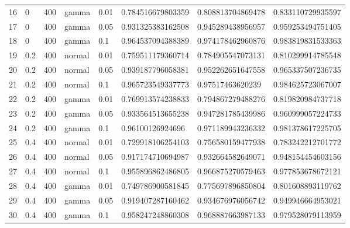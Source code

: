 \begin{table}[ht]
\begin{tabular}{rlllllll}
  16 & 0 & 400 & gamma & 0.01 & 0.784516679803359 & 0.808813704869478 & 0.833110729935597 \\ 
  17 & 0 & 400 & gamma & 0.05 & 0.931325383162508 & 0.945289438956957 & 0.959253494751405 \\ 
  18 & 0 & 400 & gamma & 0.1 & 0.964537094388389 & 0.974178462960876 & 0.983819831533363 \\ 
  19 & 0.2 & 400 & normal & 0.01 & 0.759511179360714 & 0.784905547073131 & 0.810299914785548 \\ 
  20 & 0.2 & 400 & normal & 0.05 & 0.939187796058381 & 0.952262651647558 & 0.965337507236735 \\ 
  21 & 0.2 & 400 & normal & 0.1 & 0.965723549337773 & 0.97517463620239 & 0.984625723067007 \\ 
  22 & 0.2 & 400 & gamma & 0.01 & 0.769913574238833 & 0.794867279488276 & 0.819820984737718 \\ 
  23 & 0.2 & 400 & gamma & 0.05 & 0.933564513655238 & 0.947281785439986 & 0.960999057224733 \\ 
  24 & 0.2 & 400 & gamma & 0.1 & 0.96100126924696 & 0.971189943236332 & 0.981378617225705 \\ 
  25 & 0.4 & 400 & normal & 0.01 & 0.729918106254103 & 0.756580159477938 & 0.783242212701772 \\ 
  26 & 0.4 & 400 & normal & 0.05 & 0.917174710694987 & 0.932664582649071 & 0.948154454603156 \\ 
  27 & 0.4 & 400 & normal & 0.1 & 0.955896862486805 & 0.966875270579463 & 0.977853678672121 \\ 
  28 & 0.4 & 400 & gamma & 0.01 & 0.749786900581845 & 0.775697896850804 & 0.801608893119762 \\ 
  29 & 0.4 & 400 & gamma & 0.05 & 0.919407287160462 & 0.934676976056742 & 0.949946664953021 \\ 
  30 & 0.4 & 400 & gamma & 0.1 & 0.958247248860308 & 0.968887663987133 & 0.979528079113959 \\ 
   \hline
\end{tabular}
\end{table}

